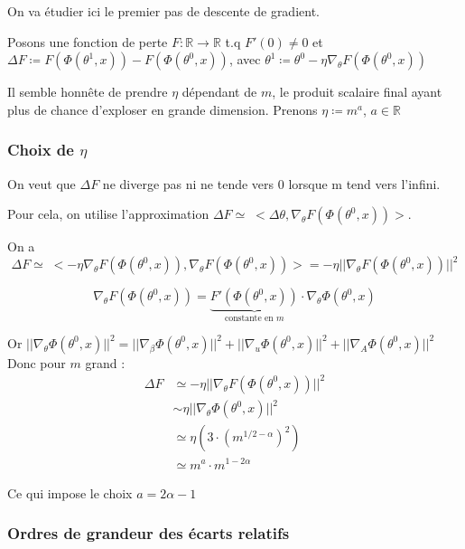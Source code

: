 \documentclass[a4paper, 11pt, french]{article}
\begin{document}
	 On va étudier ici le premier pas de descente de gradient.
	 
	 Posons une fonction de perte $F : \mathbb{R} \rightarrow \mathbb{R}$ t.q $F'(0) \neq 0$ et 
	 $\Delta F \coloneqq F(\Phi(\theta^1, x)) - F(\Phi(\theta^0, x))$, avec 
	 $\theta^1 \coloneqq \theta^0 - \eta \nabla_{\theta} F(\Phi(\theta^0, x))$
	 
	 Il semble honnête de prendre $\eta$ dépendant de $m$, le produit scalaire final ayant plus de chance d'exploser en grande dimension. Prenons $\eta \coloneqq m^a$, $a \in \mathbb{R}$ \\
	 
	 \subsubsection{Choix de $\eta$}
	 
	 On veut que $\Delta F$ ne diverge pas ni ne tende vers 0 lorsque m tend vers l'infini.
	 
	 Pour cela, on utilise l'approximation 
	 $\Delta F \simeq \; < \Delta \theta, \nabla_{\theta} F(\Phi(\theta^0, x)) >$.
	 
	 On a 
	 \[
	 \Delta F \simeq \; < -\eta \nabla_{\theta} F(\Phi(\theta^0, x)) , \nabla_{\theta} F(\Phi(\theta^0, x)) > = -\eta || \nabla_{\theta} F(\Phi(\theta^0, x)) ||^2
	 \]
	 
	 \[
	 \nabla_{\theta} F(\Phi(\theta^0, x)) = 
	 \underbrace{F'(\Phi(\theta^0, x))}_\text{constante en $m$} 
	 \cdot \nabla_{\theta} \Phi(\theta^0, x)
	 \]
	 
	 Or $ || \nabla_{\theta} \Phi(\theta^0, x) ||^2 = || \nabla_{\beta} \Phi(\theta^0, x) ||^2 + || \nabla_{u} \Phi(\theta^0, x) ||^2 + || \nabla_{A} \Phi(\theta^0, x) ||^2$ \\
	 
	 Donc pour $m$ grand :
	 \begin{align*}
	 	\Delta F &\simeq -\eta || \nabla_{\theta} F(\Phi(\theta^0, x)) ||^2 \\
	 	&\sim \eta || \nabla_{\theta} \Phi(\theta^0, x) ||^2 \\
	 	&\simeq \eta (3 \cdot (m^{1/2 - \alpha})^2) \\
	 	&\simeq m^a \cdot m^{1 - 2\alpha}
	 \end{align*}	
	
	Ce qui impose le choix $a = 2\alpha - 1$ \\
	
	\subsubsection{Ordres de grandeur des écarts relatifs}
\end{document}
